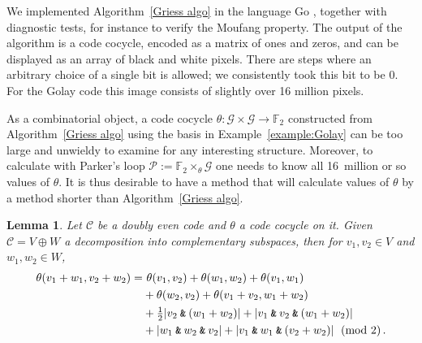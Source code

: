 \documentclass{article}
\theoremstyle{plain}
\newtheorem{lemma}{Lemma}
\theoremstyle{definition}
\def \cC {\mathcal{C}}
\def \cG {\mathcal{G}}
\def \cP {\mathcal{P}}
\def \FF {\mathbb{F}}
\def\Plus{+}
\newcommand{\AND}{\mathbin{\textup{\texttt{\&}}}}
\begin{document}
We implemented Algorithm~\ref{Griess algo} in the language Go \cite{RN_GH}, together with diagnostic tests, for instance to verify the Moufang property.
The output of the algorithm is a code cocycle, encoded as a matrix of ones and zeros, and can be displayed as an array of black and white pixels. There are steps where an arbitrary choice of a single bit is allowed; we consistently took this bit to be 0.
For the Golay code this image consists of slightly over 16 million pixels.

As a combinatorial object, a code cocycle $\theta\colon \cG \times \cG\to \FF_2$ constructed from Algorithm~\ref{Griess algo} using the basis in Example~\ref{example:Golay} can be too large and unwieldy to examine for any interesting structure. 
Moreover, to calculate with Parker's loop $\cP := \FF_2\times_\theta \cG$ one needs to know all 16~million or so values of $\theta$.
It is thus desirable to have a method that will calculate values of $\theta$ by a method shorter than Algorithm~\ref{Griess algo}.

\begin{lemma}\label{lemma:formula lemma}
Let $\cC$ be a doubly even code and $\theta$ a code cocycle on it. 
Given $\cC = V\oplus W$ a decomposition into complementary subspaces, then for $v_1,v_2\in V$ and $w_1,w_2\in W$,
\begin{align}\label{eq:theformula}
	\theta(v_1\Plus w_1,v_2\Plus w_2)	
		 =&\ \theta(v_1,v_2)  + \theta(w_1,w_2) + \theta(v_1,w_1) \\
		&+ \theta(w_2,v_2) + \theta(v_1\Plus v_2,w_1\Plus w_2) \nonumber \\
							& + \tfrac12|v_2\AND(w_1\Plus w_2)| + |v_1\AND v_2 \AND (w_1\Plus w_2)| \nonumber \\
							&+|w_1\AND w_2 \AND v_2| + \left|v_1\AND w_1 \AND (v_2 \Plus  w_2)\right| \pmod 2\,. \nonumber
\end{align}
\end{lemma}
\end{document}
